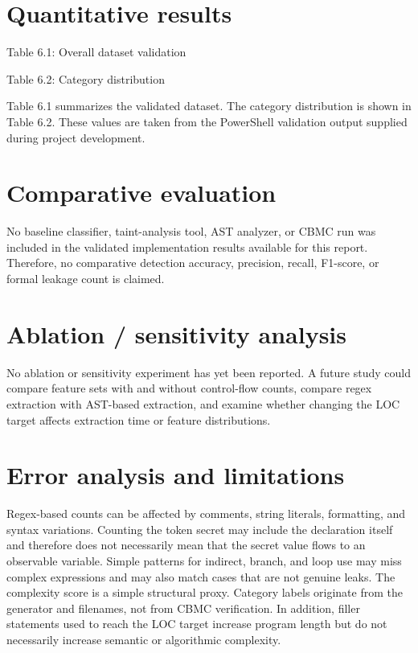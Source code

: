 \documentclass[12pt,a4paper,oneside]{report}
\begin{document}
\section{Quantitative results}
Table 6.1: Overall dataset validation\par
Table 6.2: Category distribution\par
Table 6.1 summarizes the validated dataset. The category distribution is shown in Table 6.2. These values are taken from the PowerShell validation output supplied during project development.\par

\section{Comparative evaluation}
No baseline classifier, taint-analysis tool, AST analyzer, or CBMC run was included in the validated implementation results available for this report. Therefore, no comparative detection accuracy, precision, recall, F1-score, or formal leakage count is claimed.\par

\section{Ablation / sensitivity analysis}
No ablation or sensitivity experiment has yet been reported. A future study could compare feature sets with and without control-flow counts, compare regex extraction with AST-based extraction, and examine whether changing the LOC target affects extraction time or feature distributions.\par

\section{Error analysis and limitations}
Regex-based counts can be affected by comments, string literals, formatting, and syntax variations. Counting the token secret may include the declaration itself and therefore does not necessarily mean that the secret value flows to an observable variable. Simple patterns for indirect, branch, and loop use may miss complex expressions and may also match cases that are not genuine leaks. The complexity score is a simple structural proxy. Category labels originate from the generator and filenames, not from CBMC verification. In addition, filler statements used to reach the LOC target increase program length but do not necessarily increase semantic or algorithmic complexity.\par
\end{document}
